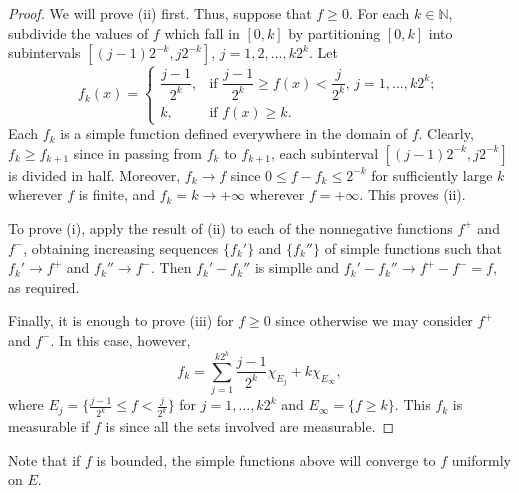 \documentclass[11pt]{article}
\begin{document}
\begin{proof}
  We will prove (ii) first.  Thus, suppose that $f \geqslant 0$.  For each $k \in \mathbb{N}$, subdivide the values of $f$ which fall in $[0,k]$ by partitioning $[0,k]$ into subintervals $[(j-1) 2^{-k}, j 2^{-k}]$, $j = 1, 2, \dots, k 2^k$.  Let
  \[
    f_k(x) =
    \begin{cases}
      \dfrac{j-1}{2^k}, & \text{if $\dfrac{j-1}{2^k} \geqslant f(x) < \dfrac{j}{2^k}$, $j = 1, \dots, k2^k$}; \\
      k,                & \text{if $f(x) \geqslant k$}.
    \end{cases}
  \]
  Each $f_k$ is a simple function defined everywhere in the domain of $f$.  Clearly, $f_k \geqslant f_{k+1}$ since in passing from $f_k$ to $f_{k+1}$, each subinterval $[(j-1) 2^{-k}, j 2^{-k}]$ is divided in half.  Moreover, $f_k \to f$ since $0 \leqslant f - f_k \leqslant 2^{-k}$ for sufficiently large $k$ wherever $f$ is finite, and $f_k = k \to +\infty$ wherever $f = +\infty$.  This proves (ii).

  To prove (i), apply the result of (ii) to each of the nonnegative functions $f^+$ and $f^-$, obtaining increasing sequences $\{ f_k' \}$ and $\{ f_k'' \}$ of simple functions such that $f_k' \to f^+$ and $f_k'' \to f^-$.  Then $f_k' - f_k''$ is simplle and $f_k' - f_k'' \to f^+ - f^- = f$, as required.

  Finally, it is enough to prove (iii) for $f \geqslant 0$ since otherwise we may consider $f^+$ and $f^-$.  In this case, however,
  \[
    f_k = \sum_{j=1}^{k2^k} \frac{j-1}{2^k} \chi_{E_j} + k \chi_{E_\infty},
  \]
  where $E_j = \{ \frac{j-1}{2^k} \leqslant f < \frac{j}{2^k} \}$ for $j = 1, \dots, k2^k$ and $E_\infty = \{ f \geqslant k \}$.  This $f_k$ is measurable if $f$ is since all the sets involved are measurable.
\end{proof}

Note that if $f$ is bounded, the simple functions above will converge to $f$ uniformly on $E$.
\end{document}
